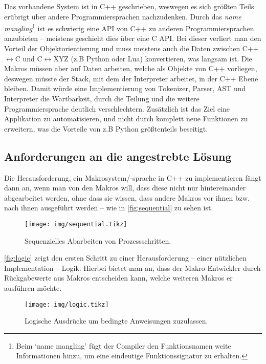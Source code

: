     Das vorhandene System ist in C++ geschrieben, weswegen es sich größten Teils erübrigt über andere Programmiersprachen nachzudenken. Durch das \emph{name mangling}\footnote{
      Beim `name mangling' fügt der Compiler den Funktionsnamen weite Informationen hinzu, um eine eindeutige Funktionssignatur zu erhalten.
    } ist es schwierig eine API von C++ zu anderen Programmiersprachen anzubieten -- meistens geschieht dies über eine C API. Bei dieser verliert man den Vorteil der Objektorientierung und muss meistens auch die Daten zwischen C++$\longleftrightarrow$C und C$\longleftrightarrow$XYZ (z.B Python oder Lua) konvertieren, was langsam ist. Die Makros müssen aber auf Daten arbeiten, welche als Objekte von C++ vorliegen, deswegen müsste der Stack, mit dem der Interpreter arbeitet, in der C++ Ebene bleiben. Damit würde eine Implementierung von Tokenizer, Parser, AST und Interpreter die Wartbarkeit, durch die Teilung und die weitere Programmiersprache deutlich verschlechtern. Zusätzlich ist das Ziel eine Applikation zu automatisieren, und nicht durch komplett neue Funktionen zu erweitern, was die Vorteile von z.B Python größtenteils beseitigt.

  \subsection{Anforderungen an die angestrebte Lösung}
  \label{ssec:Anforderungen an die angestrebte Lösung}
    Die Herausforderung, ein Makrosystem/-sprache in C++ zu implementieren fängt dann an, wenn man von den Makros will, dass diese nicht nur hintereinander abgearbeitet werden, ohne dass sie wissen, dass andere Makros vor ihnen bzw. nach ihnen ausgeführt werden -- wie in \autoref{fig:sequential} zu sehen ist.

    \begin{figure}[H]
      \centering
      \texttt{[image: img/sequential.tikz]}
      \caption{Sequenzielles Abarbeiten von Prozessschritten.}
      \label{fig:sequential}
    \end{figure}

    \autoref{fig:logic} zeigt den ersten Schritt zu einer Herausforderung -- einer nützlichen Implementation -- Logik. Hierbei bietet man an, dass der Makro-Entwickler durch Rückgabewerte aus Makros entscheiden kann, welche weiteren Makros er ausführen möchte.

    \begin{figure}[H]
      \centering
      \texttt{[image: img/logic.tikz]}
      \caption{Logische Ausdrücke um bedingte Anweisungen zuzulassen.}
      \label{fig:logic}
    \end{figure}

